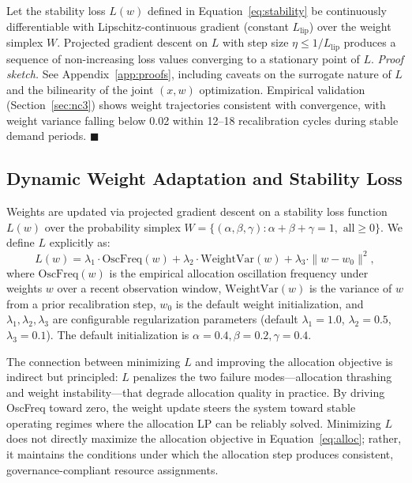 \documentclass[runningheads]{llncs}
\begin{document}
\begin{proposition}
Let the stability loss $L(w)$ defined in Equation~\ref{eq:stability} be continuously differentiable with Lipschitz-continuous gradient (constant $L_{\text{lip}}$) over the weight simplex $W$. Projected gradient descent on $L$ with step size $\eta \leq 1/L_{\text{lip}}$ produces a sequence of non-increasing loss values converging to a stationary point of $L$. \emph{Proof sketch.} See Appendix~\ref{app:proofs}, including caveats on the surrogate nature of $L$ and the bilinearity of the joint $(x, w)$ optimization. Empirical validation (Section~\ref{sec:nc3}) shows weight trajectories consistent with convergence, with weight variance falling below 0.02 within 12--18 recalibration cycles during stable demand periods. $\blacksquare$
\end{proposition}

\subsection{Dynamic Weight Adaptation and Stability Loss}

Weights are updated via projected gradient descent on a stability loss function $L(w)$ over the probability simplex $W = \{(\alpha, \beta, \gamma) : \alpha + \beta + \gamma = 1, \text{ all} \geq 0\}$. We define $L$ explicitly as:
\begin{equation}
L(w) = \lambda_1 \cdot \text{OscFreq}(w) + \lambda_2 \cdot \text{WeightVar}(w) + \lambda_3 \cdot \|w - w_0\|^2,
\label{eq:stability}
\end{equation}
where $\text{OscFreq}(w)$ is the empirical allocation oscillation frequency under weights $w$ over a recent observation window, $\text{WeightVar}(w)$ is the variance of $w$ from a prior recalibration step, $w_0$ is the default weight initialization, and $\lambda_1, \lambda_2, \lambda_3$ are configurable regularization parameters (default $\lambda_1 = 1.0$, $\lambda_2 = 0.5$, $\lambda_3 = 0.1$). The default initialization is $\alpha = 0.4, \beta = 0.2, \gamma = 0.4$.

The connection between minimizing $L$ and improving the allocation objective is indirect but principled: $L$ penalizes the two failure modes---allocation thrashing and weight instability---that degrade allocation quality in practice. By driving OscFreq toward zero, the weight update steers the system toward stable operating regimes where the allocation LP can be reliably solved. Minimizing $L$ does not directly maximize the allocation objective in Equation~\ref{eq:alloc}; rather, it maintains the conditions under which the allocation step produces consistent, governance-compliant resource assignments.
\end{document}
